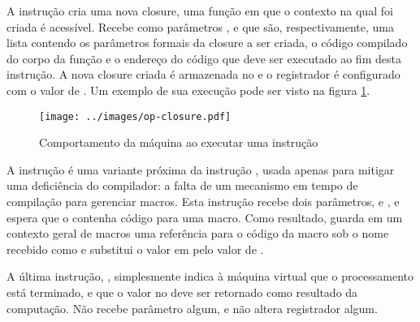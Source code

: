 A instrução   cria uma nova closure, uma função
em que o contexto na qual foi criada é acessível. Recebe como parâmetros
,  e  que são, respectivamente, uma
lista contendo os parâmetros formais da closure a ser criada, o código
compilado do corpo da função e o endereço do código que deve ser executado ao
fim desta instrução. A nova closure criada é armazenada no  e
o registrador  é configurado com o valor de . Um exemplo de sua
execução pode ser visto na figura \ref{fig:op-closure}. 

\begin{figure}[h!]
\centering
\texttt{[image: ../images/op-closure.pdf]}
\caption{Comportamento da máquina ao executar uma instrução }
\label{fig:op-closure}
\end{figure}


A instrução  é uma variante próxima da instrução ,
usada apenas para mitigar uma deficiência do compilador: a falta de um
mecanismo em tempo de compilação para gerenciar macros. Esta instrução recebe
dois parâmetros,  e , e espera que o 
contenha código para uma macro. Como resultado, guarda em um contexto geral de
macros uma referência para o código da macro sob o nome recebido como
 e substitui o valor em  pelo valor de .

A última instrução, , simplesmente indica à máquina virtual que o
processamento está terminado, e que o valor no  deve ser
retornado como resultado da computação. Não recebe parâmetro algum, e não
altera registrador algum.


